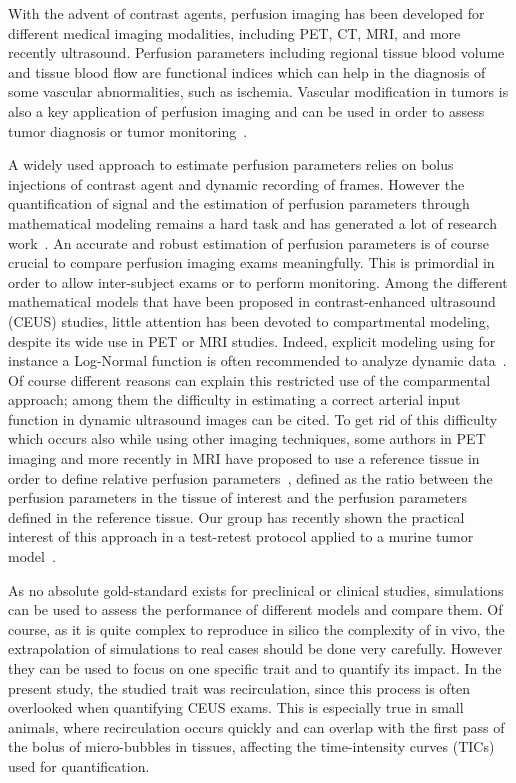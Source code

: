 With the advent of contrast agents, perfusion imaging has been developed for different medical imaging modalities, including PET, CT, MRI, and more recently ultrasound. Perfusion parameters including regional tissue blood volume and tissue blood flow are functional indices which can help in the  diagnosis of some vascular abnormalities, such as ischemia. Vascular modification in tumors is also a key application of perfusion imaging and can be used in order to assess tumor diagnosis or tumor monitoring~\cite{Dietrich:2012kw}. 

A widely used approach to estimate perfusion parameters relies on bolus injections of contrast agent and dynamic recording of frames. However the quantification of signal and the estimation of perfusion parameters through mathematical modeling remains a hard task and has generated a lot of research work~\cite{Turco:2016}. An accurate and robust estimation of perfusion parameters is of course crucial to compare perfusion imaging exams meaningfully. This is primordial in order to allow inter-subject exams or to perform monitoring. 
Among the different mathematical models that have been proposed in contrast-enhanced ultrasound (CEUS) studies, little attention has been devoted to compartmental modeling, despite its wide use in PET or MRI studies. Indeed, explicit modeling using for instance a Log-Normal function is often recommended to analyze dynamic data~\cite{Strouthos2010it,Dietrich:2012kw}.
Of course different reasons can explain this restricted use of the comparmental approach; among them the difficulty in estimating a correct arterial input function in dynamic ultrasound images can be cited. To get rid of this difficulty which occurs also while using other imaging techniques, some authors in PET imaging and more recently in MRI have proposed to use a reference tissue in order to define relative perfusion parameters~\cite{Yankeelov2005de,CardenasRodriguez:2013em}, defined as the ratio between the perfusion parameters in the tissue of interest and the perfusion parameters defined in the reference tissue. Our group has recently shown the practical interest of this approach in a test-retest protocol applied to a murine tumor model~\cite{Doury:2016fi,Doury:2017fz}. 

As no absolute gold-standard exists for preclinical or clinical studies, simulations can be used to assess the performance of different models and compare them. Of course, as it is quite complex to reproduce in silico the complexity of in vivo, the extrapolation of simulations to real cases should be done very carefully. However they can be used to focus on one specific trait and to quantify its impact. In the present study, the studied trait was recirculation, since this process is often overlooked when quantifying CEUS exams. This is especially true in small animals, where recirculation occurs quickly and can overlap with the first pass of the bolus of micro-bubbles in tissues, affecting the time-intensity curves (TICs) used for quantification.

